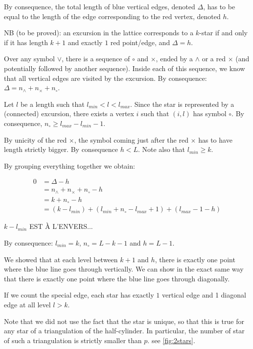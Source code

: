 \documentclass{amsart}
\theoremstyle{remark}
\begin{document}
By consequence, the total length of blue vertical edges, denoted $\Delta$, has to be equal to the length of the edge corresponding to the red vertex, denoted $h$.

NB (to be proved): an excursion in the lattice corresponds to a $k$-star if and only if it has length $k+1$ and exactly $1$ red point/edge, and $\Delta=h$.


Over any symbol $\vee$, there is a sequence of $\circ$ and $\times$, ended by a $\wedge$ or a red $\times$ (and potentially followed by another sequence). Inside each of this sequence,  we know that all vertical edges are visited by the excursion. By consequence: $\Delta=n_\wedge+n_\times+n_\circ$. 

Let $l$ be a length such that $l_{min}<l<l_{max}$. Since the star is represented by a (connected) excursion, there exists a vertex $i$ such that $(i,l)$ has symbol $\circ$. By consequence, $n_\circ\geq l_{max}-l_{min}-1$.

By unicity of the red $\times$, the symbol coming just after the red $\times$ has to have length strictly bigger. By consequence $h<L$.  Note also that $l_{min}\geq k$.

By grouping everything together we obtain:

\begin{align}
0&=\Delta-h \\
&=n_\wedge+n_\times+n_\circ-h\\
&=k+n_\circ-h\\
&=(k-l_{min})+(l_{min}+n_\circ-l_{max}+1)+(l_{max}-1-h)
\end{align}

$k-l_{min}$ EST À L'ENVERS...  

By consequence: $l_{min}=k$, $n_\circ=L-k-1$ and $h=L-1$.

We showed that at each level between $k+1$ and $h$, there is exactly one point where the blue line goes through vertically. We can show in the exact same way that there is exactly one point where the blue line goes through diagonally.

If we count the special edge, each star has exactly $1$ vertical edge and 1 diagonal edge at all level $l>k$.


Note that we did not use the fact that the star is unique, so that this is true for any star of a triangulation of the half-cylinder. In particular, the number of star of such a triangulation is strictly smaller than $p$. see \cref{fig:2stars}.
\end{document}
